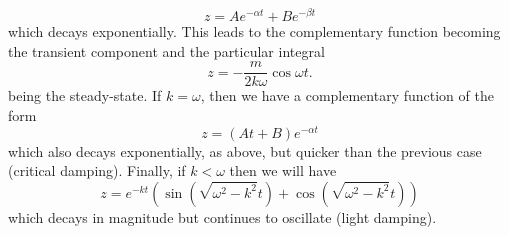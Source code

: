 \documentclass{article}
\begin{document}
\begin{equation*}
    z = Ae^{-\alpha t} + Be^{-\beta t}
\end{equation*}
which decays exponentially. This leads to the complementary function becoming the transient component and the particular integral
\begin{equation*}
    z = -\frac{m}{2k\omega}\cos \omega t.
\end{equation*}
being the steady-state. If $k = \omega$, then we have a complementary function of the form
\begin{equation*}
    z = (At+B)e^{-\alpha t}
\end{equation*}
which also decays exponentially, as above, but quicker than the previous case (critical damping). Finally, if $k < \omega$ then we will have 
\begin{equation*}
    z = e^{-kt}(\sin(\sqrt{\omega^2 - k^2} t) + \cos(\sqrt{\omega^2 - k^2} t))
\end{equation*}
which decays in magnitude but continues to oscillate (light damping).

\hrulefill
\end{document}
